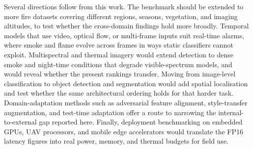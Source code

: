 \documentclass[conference]{IEEEtran}
\begin{document}
Several directions follow from this work. The benchmark should be extended to more fire datasets covering different regions, seasons, vegetation, and imaging altitudes, to test whether the cross-domain findings hold more broadly. Temporal models that use video, optical flow, or multi-frame inputs suit real-time alarms, where smoke and flame evolve across frames in ways static classifiers cannot exploit. Multispectral and thermal imagery would extend detection to dense smoke and night-time conditions that degrade visible-spectrum models, and would reveal whether the present rankings transfer. Moving from image-level classification to object detection and segmentation would add spatial localisation and test whether the same architectural ordering holds for that harder task. Domain-adaptation methods such as adversarial feature alignment, style-transfer augmentation, and test-time adaptation offer a route to narrowing the internal-to-external gap reported here. Finally, deployment benchmarking on embedded GPUs, UAV processors, and mobile edge accelerators would translate the FP16 latency figures into real power, memory, and thermal budgets for field use.







\end{document}
